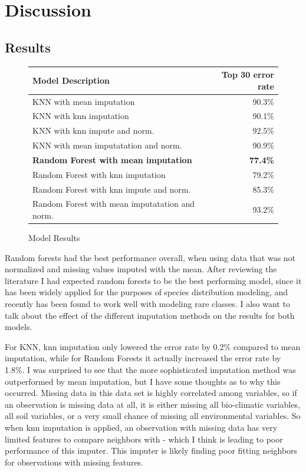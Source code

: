 \documentclass[12pt, oneside]{article}
\begin{document}
\section{Discussion}
\label{Discussion}

\begin{normalsize}

\subsection{Results}

\begin{figure}[H]
\caption{Model Results}
\centering
\footnotesize
\setlength{\tabcolsep}{0.5em} %
{\renewcommand{\arraystretch}{1.2}%
\begin{tabular}{ |l|r| }
\hline
Model Description & Top 30 error rate \\
\hline
 KNN with mean imputation & 90.3\% \\
 KNN with knn imputation & 90.1\% \\  
 KNN with knn impute and norm. & 92.5\% \\
 KNN with mean imputatation and norm. & 90.9\% \\
 \hline
\textbf{Random Forest with mean imputation} & \textbf{77.4\%} \\
 Random Forest with knn imputation & 79.2\% \\  
 Random Forest with knn impute and norm. & 85.3\% \\
 Random Forest with mean imputatation and norm. & 93.2\% \\
 \hline
\end{tabular}
}
\end{figure}

Random forests had the best performance overall, when using data that was not normalized and missing values imputed with the mean. After reviewing the literature I had expected random forests to be the best performing model, since it has been widely applied for the purposes of species distribution modeling, and recently has been found to work well with modeling rare classes. I also want to talk about the effect of the different imputation methods on the results for both models.

For KNN, knn imputation only lowered the error rate by 0.2\% compared to mean imputation, while for Random Forests it actually increased the error rate by 1.8\%. I was surprised to see that the more sophisticated imputation method was outperformed by mean imputation, but I have some thoughts as to why this occurred. Missing data in this data set is highly correlated among variables, so if an observation is missing data at all, it is either missing all bio-climatic variables, all soil variables, or a very small chance of missing all environmental variables. So when knn imputation is applied, an observation with missing data has very limited features to compare neighbors with - which I think is leading to poor performance of this imputer. This imputer is likely finding poor fitting neighbors for observations with missing features.


\end{normalsize}
\end{document}
